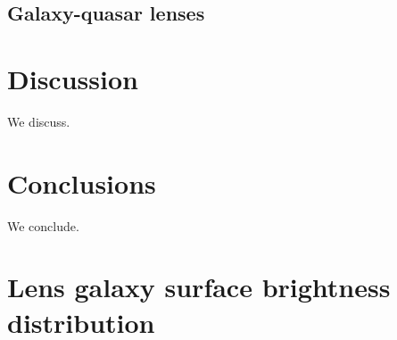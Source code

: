 \documentclass{aa}
\begin{document}
\subsection{Galaxy-quasar lenses}



\section{Discussion}\label{sect:discuss}

We discuss.


\section{Conclusions}\label{sect:concl}

We conclude.








\appendix
\section{Lens galaxy surface brightness distribution}\label{sect:appendixa}
\end{document}

